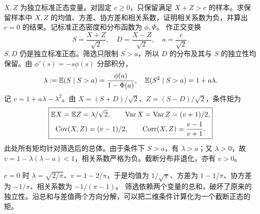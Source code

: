 $X,Z$ 为独立标准正态变量。对固定 $c\ge0$，只保留满足 $X+Z>c$ 的样本。求保留样本中 $X,Z$ 的均值、方差、协方差和相关系数，证明相关系数为负，并算出 $c=0$ 的结果。记标准正态密度和分布函数为 $\phi,\Phi$。
\solution 作正交变换
\[
S=\frac{X+Z}{\sqrt2},\quad D=\frac{X-Z}{\sqrt2},
\quad a=\frac c{\sqrt2}.
\]
$S,D$ 仍是独立标准正态。筛选只限制 $S>a$，所以 $D$ 的分布及其与 $S$ 的独立性均保留。由 $\phi'(s)=-s\phi(s)$ 分部积分，
\[
\lambda:=\mathbb{E}(S\mid S>a)=\frac{\phi(a)}{1-\Phi(a)},\quad
\mathbb{E}(S^2\mid S>a)=1+a\lambda.
\]
记 $v=1+a\lambda-\lambda^2$。由 $X=(S+D)/\sqrt2$、$Z=(S-D)/\sqrt2$，条件矩为
\[
\boxed{\begin{gathered}
\mathbb{E} X=\mathbb{E} Z=\lambda/\sqrt2,\qquad
\operatorname{Var} X=\operatorname{Var} Z=(v+1)/2,\\
\operatorname{Cov}(X,Z)=(v-1)/2,\qquad
\operatorname{Corr}(X,Z)=\frac{v-1}{v+1}.
\end{gathered}}
\]
此处所有矩均针对筛选后的总体。由于条件下 $S>a$，有 $\lambda>a$；又 $\lambda>0$，故 $v=1-\lambda(\lambda-a)<1$，相关系数严格为负。截断分布非退化，亦有 $v>0$。

$c=0$ 时 $\lambda=\sqrt{2/\pi}$、$v=1-2/\pi$，于是均值为 $1/\sqrt\pi$、方差为 $1-1/\pi$、协方差为 $-1/\pi$、相关系数为 $-1/(\pi-1)$。
\insight 筛选依赖两个变量的总和，破坏了原来的独立性。沿总和与差值两个方向分解，可以把二维条件计算化为一个截断正态的矩。

